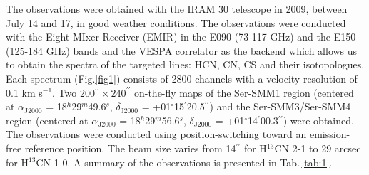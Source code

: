 \documentclass[a4paper]{article}
\begin{document}
\indent \indent The observations were obtained with the IRAM 30 telescope in 2009, between July 14 and 17, in good weather conditions. The observations were conducted with the Eight MIxer Receiver (EMIR) in the E090 (73-117 GHz) and the E150 (125-184 GHz) bands and the VESPA correlator as the backend which allows us to obtain the spectra of the targeted lines: HCN, CN, CS and their isotopologues. Each spectrum (Fig.\ref{fig1}) consists of 2800 channels with a velocity resolution of 0.1 km s$^{-1}$. Two 200$^{\prime\prime}\times 240^{\prime\prime}$ on-the-fly maps of the Ser-SMM1 region (centered at $\alpha_\mathrm{J2000}$ = 18$^h$29$^m$49.6$^s$, $\delta_\mathrm{J2000}$ = +01$^{\circ}$15$^{\prime}$20.5$^{\prime\prime}$) and the Ser-SMM3/Ser-SMM4 region (centered at $\alpha_\mathrm{J2000}$ = 18$^h$29$^m$56.6$^s$, $\delta_\mathrm{J2000}$ = +01$^{\circ}$14$^{\prime}$00.3$^{\prime\prime}$) were obtained. The observations were conducted using position-switching toward an emission-free reference position. The beam size varies from 14$^{\prime\prime}$ for H$^{13}$CN 2-1 to 29 arcsec for H$^{13}$CN 1-0. A summary of the observations is presented in Tab.\,\ref{tab:1}.
\end{document}

